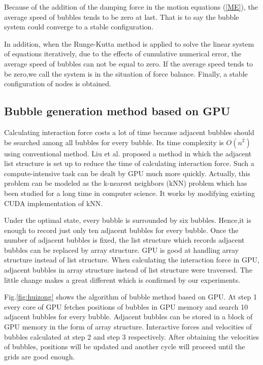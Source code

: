 \documentclass[a4paper, 11pt, final]{article}
\begin{document}
Because of the addition of the damping force in the motion equations (\ref{ME}), the average speed of
bubbles tends to be zero at last. That is to say the bubble system could converge to a stable
configuration.

In addition, when the Runge-Kutta method is applied to solve the linear system of equations iteratively,
due to the effects of cumulative numerical error, the average speed of bubbles can not be equal to zero.
If the average speed tends to be zero,we call the system is in the situation of force balance. Finally,
a stable configuration of nodes is obtained.

\subsection{Bubble generation method based on GPU}
Calculating interaction force costs a lot of time because adjacent bubbles
should be searched among all bubbles for every bubble. 
Its time complexity is \(O(n^2)\) using conventional method. 
Liu et al.\cite{12} proposed a method in which the adjacent list structure
is set up to reduce the time of calculating interaction force.
Such a compute-intensive task can be dealt by GPU much more quickly.
Actually, this problem can be modeled as the k-nearest neighbors (kNN)
problem which has been studied for a long time in computer science. 
It works by modifying existing CUDA implementation of kNN. 

Under the optimal state, every bubble is surrounded by six bubbles.
Hence,it is enough to record just only ten adjacent bubbles 
for every bubble. Once the number of adjacent bubbles is fixed, the list
structure which records adjacent bubbles can be replaced by array structure.
GPU is good at handling array structure instead of list structure.
When calculating the interaction force in GPU, adjacent bubbles
in array structure instead of list structure were traversed. The little change
makes a great different which is confirmed by our experiments. 

Fig.\;\ref{fig:huizong}  shows the algorithm of bubble method based on GPU.
At step 1 every core of GPU fetches positions of bubbles in GPU memory and
search 10 adjacent bubbles for every bubble. Adjacent bubbles can be stored
in a block of GPU memory in the form of array structure. Interactive forces
and velocities of bubbles calculated at step 2 and step 3 respectively. After
obtaining the velocities of bubbles, positions will be updated and another
cycle will proceed until the grids are good enough.
\end{document}
